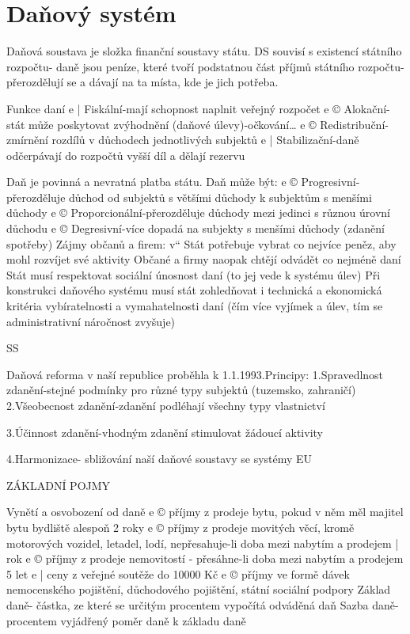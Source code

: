 \chapter{Daňový systém}

Daňová soustava je složka finanční soustavy státu. DS souvisí s existencí státního rozpočtu-
daně jsou peníze, které tvoří podstatnou část příjmů státního rozpočtu- přerozdělují se a dávají
na ta místa, kde je jich potřeba.

Funkce daní
e | Fiskální-mají schopnost naplnit veřejný rozpočet
e © Alokační-stát může poskytovat zvýhodnění (daňové úlevy)-očkování\ldots
e © Redistribuční-zmírnění rozdílů v důchodech jednotlivých subjektů
e | Stabilizační-daně odčerpávají do rozpočtů vyšší díl a dělají rezervu

Daň je povinná a nevratná platba státu.
Daň může být:
e © Progresivní-přerozděluje důchod od subjektů s většími důchody k subjektům
s menšími důchody
e © Proporcionální-přerozděluje důchody mezi jedinci s různou úrovní důchodu
e © Degresivní-více dopadá na subjekty s menšími důchody (zdanění spotřeby)
Zájmy občanů a firem:
v“ Stát potřebuje vybrat co nejvíce peněz, aby mohl rozvíjet své aktivity
Občané a firmy naopak chtějí odvádět co nejméně daní
Stát musí respektovat sociální únosnost daní (to jej vede k systému úlev)
Při konstrukci daňového systému musí stát zohledňovat i technická a ekonomická
kritéria vybíratelnosti a vymahatelnosti daní
(čím více vyjímek a úlev, tím se administrativní náročnost zvyšuje)

SS

Daňová reforma v naší republice proběhla k 1.1.1993.Principy:
1.Spravedlnost zdanění-stejné podmínky pro různé typy subjektů (tuzemsko, zahraničí)
2.Všeobecnost zdanění-zdanění podléhají všechny typy vlastnictví

3.Účinnost zdanění-vhodným zdanění stimulovat žádoucí aktivity

4.Harmonizace- sbližování naší daňové soustavy se systémy EU

ZÁKLADNÍ POJMY

Vynětí a osvobození od daně
e © příjmy z prodeje bytu, pokud v něm měl majitel bytu bydliště alespoň 2 roky
e © příjmy z prodeje movitých věcí, kromě motorových vozidel, letadel, lodí, nepřesahuje-li doba
mezi nabytím a prodejem | rok
e © příjmy z prodeje nemovitostí - přesáhne-li doba mezi nabytím a prodejem 5 let
e | ceny z veřejné soutěže do 10000 Kč
e © příjmy ve formě dávek nemocenského pojištění, důchodového pojištění, státní sociální
podpory
Základ daně- částka, ze které se určitým procentem vypočítá odváděná daň
Sazba daně- procentem vyjádřený poměr daně k základu daně

